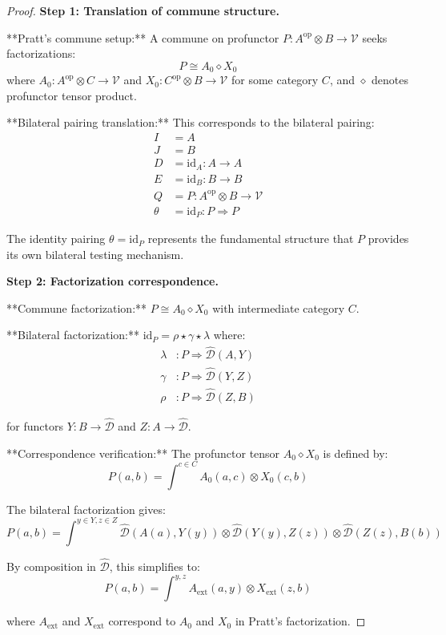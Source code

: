 \documentclass[11pt]{article}
\theoremstyle{plain}
\theoremstyle{definition}
\theoremstyle{remark}
\newcommand{\V}{\mathcal{V}}
\newcommand{\op}{\mathrm{op}}
\newcommand{\wh}[1]{\widehat{#1}}
\begin{document}
\begin{proof}
\textbf{Step 1: Translation of commune structure.}

**Pratt's commune setup:** A commune on profunctor $P : A^{\op} \otimes B \to \V$ seeks factorizations:
$$P \cong A_0 \diamond X_0$$
where $A_0 : A^{\op} \otimes C \to \V$ and $X_0 : C^{\op} \otimes B \to \V$ for some category $C$, and $\diamond$ denotes profunctor tensor product.

**Bilateral pairing translation:** This corresponds to the bilateral pairing:
\begin{align}
I &= A \\
J &= B \\
D &= \text{id}_A : A \to A \\
E &= \text{id}_B : B \to B \\
Q &= P : A^{\op} \otimes B \to \V \\
\theta &= \text{id}_P : P \Rightarrow P
\end{align}

The identity pairing $\theta = \text{id}_P$ represents the fundamental structure that $P$ provides its own bilateral testing mechanism.

\textbf{Step 2: Factorization correspondence.}

**Commune factorization:** $P \cong A_0 \diamond X_0$ with intermediate category $C$.

**Bilateral factorization:** $\text{id}_P = \rho \star \gamma \star \lambda$ where:
\begin{align}
\lambda &: P \Rightarrow \wh{\mathcal{D}}(A, Y) \\
\gamma &: P \Rightarrow \wh{\mathcal{D}}(Y, Z) \\
\rho &: P \Rightarrow \wh{\mathcal{D}}(Z, B)
\end{align}

for functors $Y : B \to \wh{\mathcal{D}}$ and $Z : A \to \wh{\mathcal{D}}$.

**Correspondence verification:** The profunctor tensor $A_0 \diamond X_0$ is defined by:
$$P(a, b) = \int^{c \in C} A_0(a, c) \otimes X_0(c, b)$$

The bilateral factorization gives:
$$P(a, b) = \int^{y \in Y, z \in Z} \wh{\mathcal{D}}(A(a), Y(y)) \otimes \wh{\mathcal{D}}(Y(y), Z(z)) \otimes \wh{\mathcal{D}}(Z(z), B(b))$$

By composition in $\wh{\mathcal{D}}$, this simplifies to:
$$P(a, b) = \int^{y, z} A_{\text{ext}}(a, y) \otimes X_{\text{ext}}(z, b)$$

where $A_{\text{ext}}$ and $X_{\text{ext}}$ correspond to $A_0$ and $X_0$ in Pratt's factorization.


\end{proof}
\end{document}
